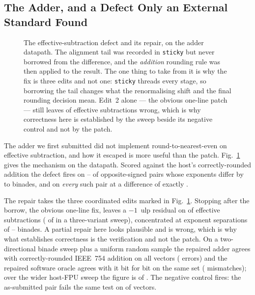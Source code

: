 \documentclass[journal,10pt]{IEEEtran}
\theoremstyle{plain}
\theoremstyle{definition}
\theoremstyle{remark}
\newcommand{\sv}[1]{\texttt{#1}}
\begin{document}
\subsection{The Adder, and a Defect Only an External Standard Found}
\label{sec:fabric-fadd}

\begin{figure}[!tb]
\centering

\caption{The effective-subtraction defect and its repair, on the adder
  datapath. The alignment tail was recorded in \sv{sticky} but never borrowed
  from the difference, and the \emph{addition} rounding rule was then applied
  to the result. The one thing to take from it is why the fix is three edits
  and not one: \sv{sticky} threads every stage, so borrowing the tail changes
  what the renormalising shift and the final rounding decision mean. Edit~2
  alone --- the obvious one-line patch --- still leaves \FpPartialPct{} of
  effective subtractions wrong, which is why correctness here is established
  by the sweep beside its negative control and not by the patch.}
\label{fig:fp64defect}
\end{figure}

The adder we first submitted did not implement round-to-nearest-even on
effective subtraction, and how it escaped is more useful than the patch.
Fig.~\ref{fig:fp64defect} gives the mechanism on the datapath. Scored against
the host's correctly-rounded addition the defect fires on \FpBandLo--\FpBandHi{} of
opposite-signed pairs whose exponents differ by \FpBandDeLo{} to
\FpBandDeHi{} binades, and on \emph{every} such pair at a difference of
exactly \FpFullDe{}.

The repair takes the three coordinated edits marked in
Fig.~\ref{fig:fp64defect}. Stopping after the borrow, the obvious one-line
fix, leaves a $-1$~ulp residual on \FpPartialPct{} of effective subtractions
(\FpPartialErrors{} of \FpPartialVectors{} in a three-variant sweep),
concentrated at exponent separations of \FpPartialDeLo--\FpPartialDeHi{}
binades. A partial repair here looks plausible and is wrong, which is why what
establishes correctness is the verification and not the patch. On a two-directional binade sweep plus
a uniform random sample the repaired adder agrees with correctly-rounded
IEEE~754 addition on all \FpAcceptVectors{} vectors (\FpAcceptErrors{}
errors) and the repaired software oracle agrees with it bit for bit on the
same set (\FpAcceptMismatch{} mismatches); over the wider host-FPU sweep the
figure is \FpSweepErrors{} of \FpSweepVectors{}. The negative control fires:
the as-submitted pair fails the same test on \FpCtrlErrors{} of
\FpCtrlVectors{} vectors.
\end{document}
